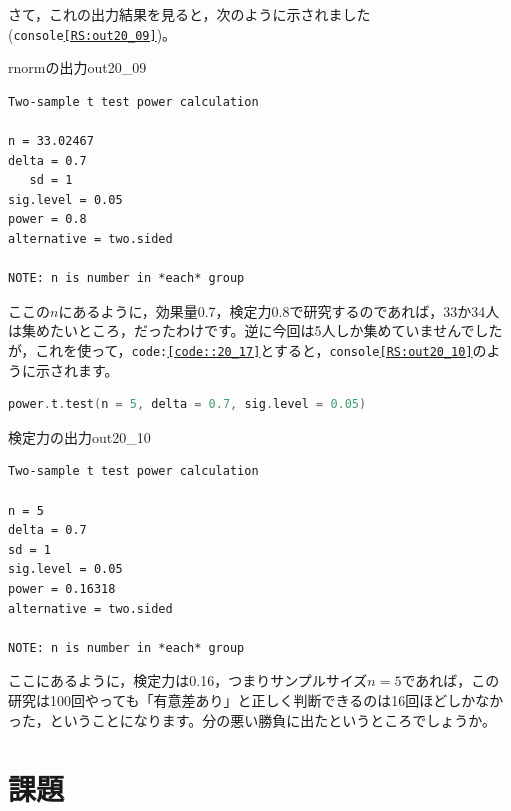 \documentclass{ltjsbook}
\begin{document}
さて，これの出力結果を見ると，次のように示されました(\texttt{console\ref{RS:out20_09}})。
\begin{Rscreen}{rnormの出力}{out20_09}
\begin{verbatim}
Two-sample t test power calculation 

n = 33.02467
delta = 0.7
   sd = 1
sig.level = 0.05
power = 0.8
alternative = two.sided

NOTE: n is number in *each* group
\end{verbatim}
\end{Rscreen}
ここの$n$にあるように，効果量0.7，検定力0.8で研究するのであれば，33か34人は集めたいところ，だったわけです。逆に今回は5人しか集めていませんでしたが，これを使って，\texttt{code:\ref{code::20_17}}とすると，\texttt{console\ref{RS:out20_10}}のように示されます。

\begin{lstlisting}[language=c++,label={code::20_17},caption={power.t.testで$n$を固定}]
power.t.test(n = 5, delta = 0.7, sig.level = 0.05)
\end{lstlisting}

\begin{Rscreen}{検定力の出力}{out20_10}
\begin{verbatim}
Two-sample t test power calculation 

n = 5
delta = 0.7
sd = 1
sig.level = 0.05
power = 0.16318
alternative = two.sided

NOTE: n is number in *each* group
\end{verbatim}
\end{Rscreen}
ここにあるように，検定力は0.16，つまりサンプルサイズ$n=5$であれば，この研究は100回やっても「有意差あり」と正しく判断できるのは16回ほどしかなかった，ということになります。分の悪い勝負に出たというところでしょうか。
\section{課題}
\end{document}

